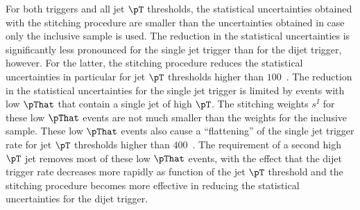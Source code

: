 For both triggers and all jet $\pT$ thresholds,
the statistical uncertainties obtained with the stitching procedure are smaller than the uncertainties obtained in case only the inclusive sample is used.
The reduction in the statistical uncertainties is significantly less pronounced for the single jet trigger than for the dijet trigger, however.
For the latter, the stitching procedure reduces the statistical uncertainties in particular for jet $\pT$ thresholds higher than $100$~\GeV.
The reduction in the statistical uncertainties for the single jet trigger is limited by events with low $\pThat$ that contain a single jet of high $\pT$.
The stitching weights $s^{I}$ for these low $\pThat$ events are not much smaller than the weights for the inclusive sample.
These low $\pThat$ events also cause a ``flattening'' of the single jet trigger rate for jet $\pT$ thresholds higher than $400$~\GeV.
The requirement of a second high $\pT$ jet removes most of these low $\pThat$ events,
with the effect that the dijet trigger rate decreases more rapidly as function of the jet $\pT$ threshold
and the stitching procedure becomes more effective in reducing the statistical uncertainties for the dijet trigger.
